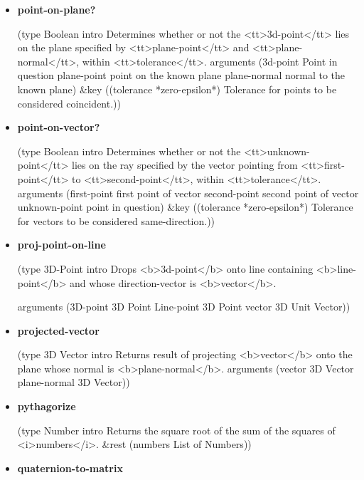 \documentclass [11pt]{book}
\begin{document}
\begin{itemize}
\item {}
\label{prim:point-on-plane?}
\textbf{point-on-plane?}

(type Boolean intro
  Determines whether or not the <tt>3d-point</tt> lies on the plane specified by <tt>plane-point</tt>
and <tt>plane-normal</tt>, within <tt>tolerance</tt>.
 arguments
 (3d-point Point in question plane-point point on the known plane
  plane-normal normal to the known plane)
 \&key
 ((tolerance *zero-epsilon*)
  Tolerance for points to be considered coincident.))



\item {}
\label{prim:point-on-vector?}
\textbf{point-on-vector?}

(type Boolean intro
  Determines whether or not the <tt>unknown-point</tt> lies on the ray specified by the vector
pointing from <tt>first-point</tt> to <tt>second-point</tt>, within <tt>tolerance</tt>.
 arguments
 (first-point first point of vector second-point second point of vector
  unknown-point point in question)
 \&key
 ((tolerance *zero-epsilon*)
  Tolerance for vectors to be considered same-direction.))



\item {}
\label{prim:proj-point-on-line}
\textbf{proj-point-on-line}

(type 3D-Point intro
  Drops <b>3d-point</b> onto line containing <b>line-point</b>
and whose direction-vector is <b>vector</b>.

 arguments
 (3D-point 3D Point Line-point 3D Point vector 3D Unit Vector))



\item {}
\label{prim:projected-vector}
\textbf{projected-vector}

(type 3D Vector intro
  Returns result of projecting <b>vector</b> onto the plane whose normal
is <b>plane-normal</b>.
 arguments (vector 3D Vector plane-normal 3D Vector))



\item {}
\label{prim:pythagorize}
\textbf{pythagorize}

(type Number intro
  Returns the square root of the sum of the squares of <i>numbers</i>.
 \&rest (numbers List of Numbers))



\item {}
\label{prim:quaternion-to-matrix}
\textbf{quaternion-to-matrix}


\end{itemize}
\end{document}
